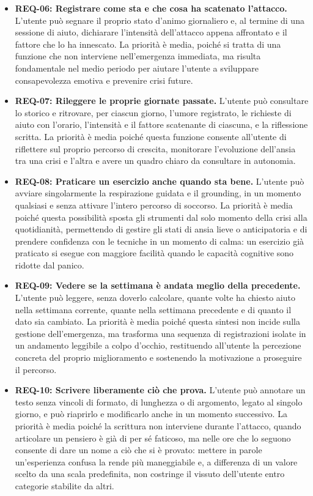 \begin{itemize}
    \item \textbf{REQ-06: Registrare come sta e che cosa ha scatenato l'attacco.} L'utente può segnare il proprio stato d'animo giornaliero e, al termine di una sessione di aiuto, dichiarare l'intensità dell'attacco appena affrontato e il fattore che lo ha innescato. La priorità è media, poiché si tratta di una funzione che non interviene nell'emergenza immediata, ma risulta fondamentale nel medio periodo per aiutare l'utente a sviluppare consapevolezza emotiva e prevenire crisi future.

    \item \textbf{REQ-07: Rileggere le proprie giornate passate.} L'utente può consultare lo storico e ritrovare, per ciascun giorno, l'umore registrato, le richieste di aiuto con l'orario, l'intensità e il fattore scatenante di ciascuna, e la riflessione scritta. La priorità è media poiché questa funzione consente all'utente di riflettere sul proprio percorso di crescita, monitorare l'evoluzione dell'ansia tra una crisi e l'altra e avere un quadro chiaro da consultare in autonomia.

    \item \textbf{REQ-08: Praticare un esercizio anche quando sta bene.} L'utente può avviare singolarmente la respirazione guidata e il grounding, in un momento qualsiasi e senza attivare l'intero percorso di soccorso. La priorità è media poiché questa possibilità sposta gli strumenti dal solo momento della crisi alla quotidianità, permettendo di gestire gli stati di ansia lieve o anticipatoria e di prendere confidenza con le tecniche in un momento di calma: un esercizio già praticato si esegue con maggiore facilità quando le capacità cognitive sono ridotte dal panico.

    \item \textbf{REQ-09: Vedere se la settimana è andata meglio della precedente.} L'utente può leggere, senza doverlo calcolare, quante volte ha chiesto aiuto nella settimana corrente, quante nella settimana precedente e di quanto il dato sia cambiato. La priorità è media poiché questa sintesi non incide sulla gestione dell'emergenza, ma trasforma una sequenza di registrazioni isolate in un andamento leggibile a colpo d'occhio, restituendo all'utente la percezione concreta del proprio miglioramento e sostenendo la motivazione a proseguire il percorso.

    \item \textbf{REQ-10: Scrivere liberamente ciò che prova.} L'utente può annotare un testo senza vincoli di formato, di lunghezza o di argomento, legato al singolo giorno, e può riaprirlo e modificarlo anche in un momento successivo. La priorità è media poiché la scrittura non interviene durante l'attacco, quando articolare un pensiero è già di per sé faticoso, ma nelle ore che lo seguono consente di dare un nome a ciò che si è provato: mettere in parole un'esperienza confusa la rende più maneggiabile e, a differenza di un valore scelto da una scala predefinita, non costringe il vissuto dell'utente entro categorie stabilite da altri.


\end{itemize}
